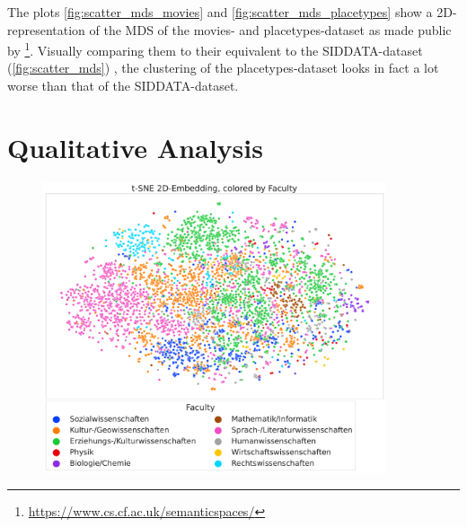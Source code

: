 The plots \ref{fig:scatter_mds_movies} and \ref{fig:scatter_mds_placetypes} show a 2D-representation of the MDS %
of the movies- and placetypes-dataset as made public by \textcite{Derrac2015}\footnote{\url{https://www.cs.cf.ac.uk/semanticspaces/}}. Visually comparing them to their equivalent to the SIDDATA-dataset (\autoref{fig:scatter_mds}) , the clustering of the placetypes-dataset looks in fact a lot worse than that of the SIDDATA-dataset.





\section{Qualitative Analysis}

\begin{figure}[h]
	\begin{center}
	  \includegraphics[width=0.9\textwidth]{graphics/dataset_new/scatter_mds_tsne_e2a70a9bf2.pdf}
	  \label{fig:scatter_mds}
	\end{center}
\end{figure}



